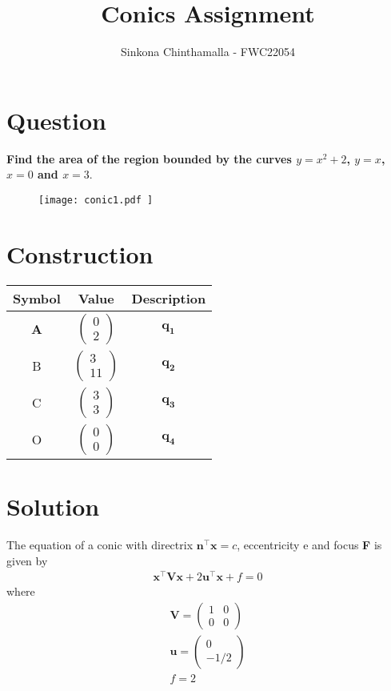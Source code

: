 \documentclass[journal,12pt,twocolumn]{IEEEtran}
\title{\textbf{\\Conics Assignment}}
\author{Sinkona Chinthamalla - FWC22054}
\let\vec\mathbf
\begin{document}
\maketitle

\section{Question}
\textbf {Find the area of the region bounded by the curves $y=x^2+2$, $y=x$, $x=0$ and $x=3. $}

\begin{figure}[h!]
\texttt{[image: conic1.pdf ]}
\end{figure}

\section{Construction}
\centering
\vspace{0.2cm}
{
\setlength\extrarowheight{2pt}
\begin{tabular}{|c|c|c|}
	\hline
	\textbf{Symbol}&\textbf{Value}&\textbf{Description}\\
	\hline
	\textbf{A} & 
	$ \begin{pmatrix}
      0 \\
      2
    \end{pmatrix}$ & $\vec{q_1} $\\
	\hline
	B & 
	$\begin{pmatrix}
     3 \\
     11
    \end{pmatrix}$ & $\vec{q_2} $\\
	\hline
	C & 
	$\begin{pmatrix}
     3 \\
     3
    \end{pmatrix}$ & $\vec{q_3} $\\
	\hline
	O & 
	$\begin{pmatrix}
     0 \\
     0
    \end{pmatrix}$ & $\vec{q_4} $\\
	\hline
\end{tabular}
}

\section{Solution}
\raggedright The equation of a conic with directrix $\vec{n}^\intercal\vec{x} = c$, eccentricity e and focus \textbf{F} is given by
\begin{align}
\vec{x}^{\top}\vec{V}\vec{x}+2\vec{u}^{\top}\vec{x}+f = 0 
\end{align}
where
\begin{align}
\vec{V} = \begin{pmatrix}
1 & 0\\
0 & 0
\end{pmatrix} \\
\vec{u} = \begin{pmatrix}
      0 \\
     -1/2
    \end{pmatrix}  \\
f = 2  
\end{align}
\end{document}
